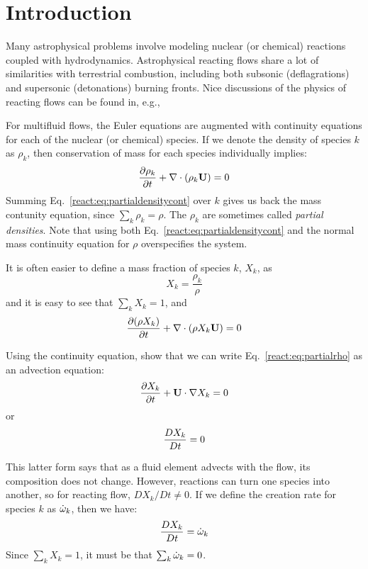 
\section{Introduction}

Many astrophysical problems involve modeling nuclear (or chemical)
reactions coupled with hydrodynamics.  Astrophysical reacting flows
share a lot of similarities with terrestrial combustion, including
both subsonic (deflagrations) and supersonic (detonations) burning
fronts.  Nice discussions of the physics of reacting flows can be
found in, e.g., \cite{oranboris, peters:2000}


For multifluid flows, the Euler equations are
augmented with continuity equations for each of the nuclear (or chemical) species.  If we denote the density of species $k$ as
$\rho_k$, then conservation of mass for each species individually
implies:
\begin{equation}
\label{react:eq:partialdensitycont}
{\frac{{\partial\rho_k}}{\partial t}} + \nabla \cdot (\rho_k {\bf U}) = 0
\end{equation}
Summing Eq.~\ref{react:eq:partialdensitycont} over $k$ gives us back
the mass contunity equation, since $\sum_k \rho_k = \rho$.  The
$\rho_k$ are sometimes called {\em partial densities}.  Note that
using both Eq.~\ref{react:eq:partialdensitycont} 
and the normal mass continuity equation for $\rho$ overspecifies 
the system.

It is often
easier to define a mass fraction of species $k$, $X_k$, as
\begin{equation}
X_k = \frac{\rho_k}{\rho}
\end{equation}
and it is easy to see that $\sum_k X_k = 1$, and 
\begin{equation}
\label{react:eq:partialrho}
\frac{\partial (\rho X_k)}{\partial t} + \nabla \cdot  (\rho X_k {\bf U}) = 0
\end{equation}

\begin{exercise}
Using the continuity equation, show that we can write
Eq.~\ref{react:eq:partialrho} as an advection equation:
\begin{equation}
\frac{\partial X_k}{\partial t} + {\bf U} \cdot \nabla X_k = 0
\end{equation}
or 
\begin{equation}
{\frac{{DX_k}}{D t}} = 0
\end{equation}
\end{exercise}

This latter form says that as a fluid element advects with the flow,
its composition does not change.  However, reactions can turn one
species into another, so for reacting flow, $DX_k/Dt \ne 0$.  If we
define the creation rate for species $k$ as ${\dot{\omega}}_k$, then we
have:
\begin{equation}
{\frac{{DX_k}}{D t}} = {\dot{\omega}}_k
\end{equation}
Since $\sum_k X_k = 1$, it must be that $\sum_k {\dot{\omega}}_k = 0$.

